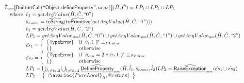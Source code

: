 \[\begin{array}{l}
\aI_{\it use}\lbr \SF{BuiltintCall}(``\SF{Object.defineProperty}",args)\rbr(\hat{H},\hat{C}) = LP_1 \cup LP_2 \cup LP_3\\
\quad\wherec{
  \hat{v}_1 = getArgValue(\hat{H}, \hat{C}, ``0")\\
  \hat{s}_{name} = \ahf{toString}(\ahf{toPrimitive}(getArgValue(\hat{H},\hat{C}, ``1")))\\
  \hat{v}_{2} = getArgValue(\hat{H},\hat{C}, ``2")\\
  LP_2 = getArgValue_{\it use}(\hat{H}, \hat{C}, ``0") \cup  getArgValue_{\it use}(\hat{H}, \hat{C}, ``1")
    \cup  getArgValue_{\it use}(\hat{H}, \hat{C}, ``2")\\
  \hat{es}_1 = \left\{\begin{array}{ll}
      \{ \SF{TypeError} \}
      & \ifc{\hat{v}_1.1 \not\sqsubseteq \bot_{PValue}}\\
      \set{} & \owc
    \end{array}\right.\\
  \hat{es}_2 = \left\{\begin{array}{ll}
      \{ \SF{TypeError} \}
      & \ifc{\hat{n}_{len} = \hat{2} \land \hat{v}_2.1 \not\sqsubseteq \bot_{PValue}}\\
      \set{} & \owc
    \end{array}\right.\\
  LP_1 = \bigcup_{\hat{l}_1 \in \hat{v}_1.2}\bigcup_{\hat{l}_2 \in \hat{v}_2.2} 
    \ahf{DefineProperty}_{\it use}(\hat{H}, \hat{l}_1, \hat{s}_{name}, \hat{l}_2)
  LP_2 = \ahf{RaiseException}_{\it use}(\hat{es}_1 \sqcup \hat{es}_2)\\ 
  LP_3 = \set{\langle\avarloc{PureLocal}_R,\varprop{return}\rangle}\\
  }\\
\\


\end{array}
\]
